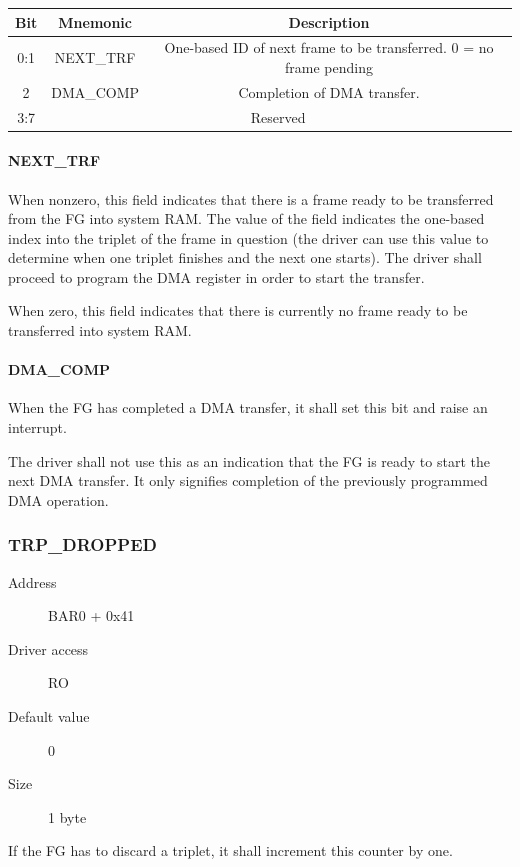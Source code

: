 \documentclass[12pt]{article}
\begin{document}
\begin{tabular}{|c|c|c|} \hline
\textbf{Bit} & \textbf{Mnemonic} & \textbf{Description} \\ \hline
0:1 & NEXT\_TRF & One-based ID of next frame to be transferred. 0 = no frame pending \\ \hline
2 & DMA\_COMP & Completion of DMA transfer. \\ \hline
3:7 & \multicolumn{2}{|c|}{Reserved} \\ \hline
\end{tabular}

\paragraph{NEXT\_TRF}

When nonzero, this field indicates that there is a frame ready to be transferred from the FG into system RAM. The value of the field indicates the one-based index into the triplet of the frame in question (the driver can use this value to determine when one triplet finishes and the next one starts). The driver shall proceed to program the DMA register in order to start the transfer.

When zero, this field indicates that there is currently no frame ready to be transferred into system RAM.

\paragraph{DMA\_COMP}

When the FG has completed a DMA transfer, it shall set this bit and raise an interrupt.

The driver shall not use this as an indication that the FG is ready to start the next DMA transfer. It only signifies completion of the previously programmed DMA operation.

\subsubsection{TRP\_DROPPED}

\begin{description}
\item[Address] BAR0 + 0x41
\item[Driver access] RO
\item[Default value] 0
\item[Size] 1 byte
\end{description}

If the FG has to discard a triplet, it shall increment this counter by one.
\end{document}
